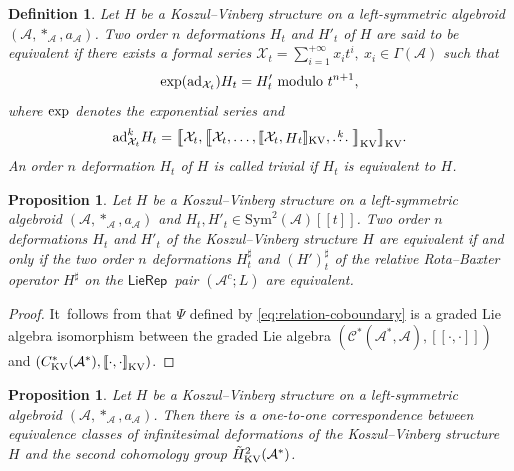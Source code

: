 \documentclass[pdftex]{sigma}%
\numberwithin{equation}{section}
\newtheorem{pro}[thm]{Proposition}
\newtheorem{defi}[thm]{Definition}
\newcommand{\huaA}{\mathcal{A}}
\newcommand{\huaC}{\mathcal{C}}
\newcommand{\huaX}{\mathcal{X}}
\newcommand{\Courant}[1]{\left[\!\left[ #1\right]\!\right]}
\newcommand{\Sym}{\mathrm{Sym}}
\newcommand{\ad}{\mathrm{ad}}
\newcommand{\LP}{$\mathsf{LieRep}$~}
\begin{document}
\begin{defi}
{\sloppy
Let $H$ be a Koszul--Vinberg structure on a left-symmetric algebroid $(\huaA,\ast_\huaA,a_\huaA)$. Two order $n$ deformations $H_t$ and $H'_t$ of $H$ are said to be {\it equivalent} if there exists a formal series $\huaX_t=\sum_{i=1}^{+\infty}x_it^i,~ x_i\in \Gamma(\huaA	)$ such that
\begin{gather*}%
{\rm exp}(\ad_{\huaX_t})H_t=H'_{t} \mbox{ modulo } t^{n+1},
\end{gather*}}\noindent
where ${\rm exp}$ denotes the exponential series and\vspace{-.5ex}
\begin{gather*}
\ad^k_{\huaX_t}H_t=\big[\hspace{-3pt}\big[\huaX_t,\big[\hspace{-3pt}\big[\huaX_t,\dots,[\hspace{-1.5pt}[\huaX_t,\stackrel{}H_t]\hspace{-1.5pt}]_{\rm KV},\stackrel{k}{\dots}\big]\hspace{-3pt}\big]_{\rm KV}\big]\hspace{-3pt}\big]_{\rm KV}.
\end{gather*}
An order $n$ deformation $H_t$ of $H$ is called {\it trivial} if $H_t$ is equivalent to $H$.
\end{defi}

{\sloppy\begin{pro}\label{pro:equivalent describe}
 Let $H$ be a Koszul--Vinberg structure on a left-symmetric algebroid $(\huaA,\ast_\huaA,a_\huaA)$ and $H_t,H'_t\in\Sym^2(\huaA)[[t]]$. Two order $n$ deformations $H_t$ and $H'_t$ of the Koszul--Vinberg structure $H$ are equivalent if and only if the two order $n$ deformations $H^\sharp_t$ and $(H')^\sharp_t$ of the relative Rota--Baxter operator $H^\sharp$ on the \LP pair $(\huaA^c;L)$ are equivalent.
\end{pro}}

\begin{proof}
It~follows from that $\Psi$ defined by \eqref{eq:relation-coboundary} is a graded Lie algebra isomorphism between the graded Lie algebra $(\huaC^*(\huaA^*,\huaA),\Courant{\cdot,\cdot})$ and $(C_{\rm KV}^{*}(\huaA^*),\Courant{\cdot,\cdot}_{\rm KV})$.
\end{proof}


{\sloppy\begin{pro}
Let $H$ be a Koszul--Vinberg structure on a left-symmetric algebroid $(\huaA,\ast_\huaA,a_\huaA)$. Then there is a one-to-one correspondence between equivalence classes of infinitesimal deformations of the Koszul--Vinberg structure $H$ and the second cohomology group $\tilde{H}_{\rm KV}^2(\huaA^*)$.
\end{pro}}
\end{document}
